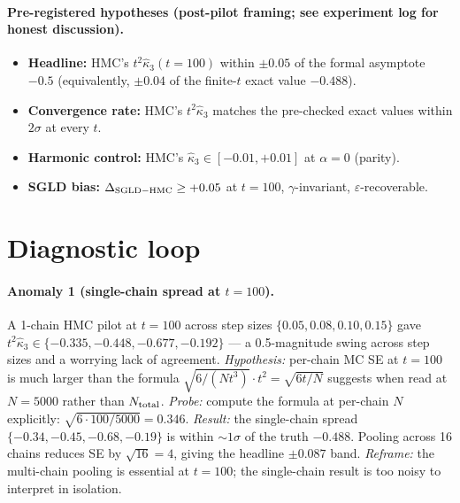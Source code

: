 \documentclass[11pt]{article}
\begin{document}
\paragraph{Pre-registered hypotheses (post-pilot framing; see
experiment log for honest discussion).}
\begin{itemize}[noitemsep,leftmargin=*]
  \item \textbf{Headline:} HMC's $t^2 \hat\kappa_3(t = 100)$ within
    $\pm 0.05$ of the formal asymptote $-0.5$ (equivalently,
    $\pm 0.04$ of the finite-$t$ exact value $-0.488$).
  \item \textbf{Convergence rate:} HMC's $t^2 \hat\kappa_3$ matches
    the pre-checked exact values within $2\sigma$ at every $t$.
  \item \textbf{Harmonic control:} HMC's $\hat\kappa_3 \in [-0.01,
    +0.01]$ at $\alpha = 0$ (parity).
  \item \textbf{SGLD bias:} $\Delta_{\rm SGLD-HMC} \geq +0.05$ at
    $t = 100$, $\gamma$-invariant, $\varepsilon$-recoverable.
\end{itemize}

\section{Diagnostic loop}

\paragraph{Anomaly 1 (single-chain spread at $t = 100$).}
A 1-chain HMC pilot at $t = 100$ across step sizes $\{0.05, 0.08, 0.10, 0.15\}$
gave $t^2 \hat\kappa_3 \in \{-0.335, -0.448, -0.677, -0.192\}$ ---
a 0.5-magnitude swing across step sizes and a worrying lack of
agreement. \emph{Hypothesis:} per-chain MC SE at $t = 100$ is much
larger than the formula $\sqrt{6/(N t^3)} \cdot t^2 = \sqrt{6 t / N}$
suggests when read at $N = 5000$ rather than $N_{\rm total}$.
\emph{Probe:} compute the formula at per-chain $N$ explicitly:
$\sqrt{6 \cdot 100 / 5000} = 0.346$. \emph{Result:} the single-chain
spread $\{-0.34, -0.45, -0.68, -0.19\}$ is within $\sim 1\sigma$ of
the truth $-0.488$. Pooling across 16 chains reduces SE by $\sqrt{16}
= 4$, giving the headline $\pm 0.087$ band. \emph{Reframe:} the
multi-chain pooling is essential at $t = 100$; the single-chain
result is too noisy to interpret in isolation.
\end{document}
